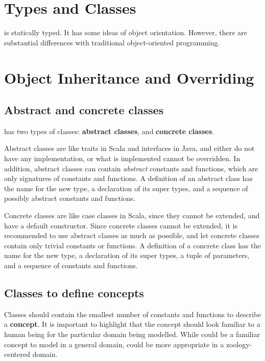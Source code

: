 \section{Types and Classes}

\Soda is statically typed.
It has some ideas of object orientation.
However, there are substantial differences with traditional object-oriented programming.


\section{Object Inheritance and Overriding}

\subsection{Abstract and concrete classes}

\Soda has two types of classes: \textbf{abstract classes}, and \textbf{concrete classes}.

Abstract classes are like traits in Scala and interfaces in Java, and either do not have any implementation, or what is implemented cannot be overridden.
In addition, abstract classes can contain \textit{abstract} constants and functions, which are only signatures of constants and functions.
A definition of an abstract class has the name for the new type, a declaration of its super types, and a sequence of possibly abstract constants and functions.

Concrete classes are like case classes in Scala, since they cannot be extended, and have a default constructor.
Since concrete classes cannot be extended, it is recommended to use abstract classes as much as possible, and let concrete classes contain only trivial constants or functions.
A definition of a concrete class has the name for the new type, a declaration of its super types, a tuple of parameters, and a sequence of constants and functions.

\subsection{Classes to define concepts}

Classes should contain the smallest number of constants and functions to describe a \textbf{concept}.
It is important to highlight that the concept should look familiar to a human being for the particular domain being modelled.
While  could be a familiar concept to model in a general domain,  could be more appropriate in a zoology-centered domain.

